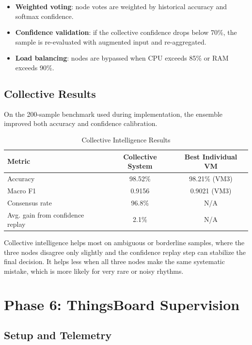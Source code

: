 \documentclass[12pt, a4paper]{article}
\begin{document}
\begin{itemize}
        \item \textbf{Weighted voting}: node votes are weighted by historical accuracy and softmax confidence.
        \item \textbf{Confidence validation}: if the collective confidence drops below 70\%, the sample is re-evaluated with augmented input and re-aggregated.
        \item \textbf{Load balancing}: nodes are bypassed when CPU exceeds 85\% or RAM exceeds 90\%.
\end{itemize}

\subsection{Collective Results}

On the 200-sample benchmark used during implementation, the ensemble improved both accuracy and confidence calibration.

\begin{table}[H]
\centering
\caption{Collective Intelligence Results}
\begin{tabular}{lcc}
\toprule
\textbf{Metric} & \textbf{Collective System} & \textbf{Best Individual VM} \\
\midrule
Accuracy & 98.52\% & 98.21\% (VM3) \\
Macro F1 & 0.9156 & 0.9021 (VM3) \\
Consensus rate & 96.8\% & N/A \\
Avg. gain from confidence replay & 2.1\% & N/A \\
\bottomrule
\end{tabular}
\label{tab:collective_results}
\end{table}

Collective intelligence helps most on ambiguous or borderline samples, where the three nodes disagree only slightly and the confidence replay step can stabilize the final decision. It helps less when all three nodes make the same systematic mistake, which is more likely for very rare or noisy rhythms.

\section{Phase 6: ThingsBoard Supervision}

\subsection{Setup and Telemetry}
\end{document}
